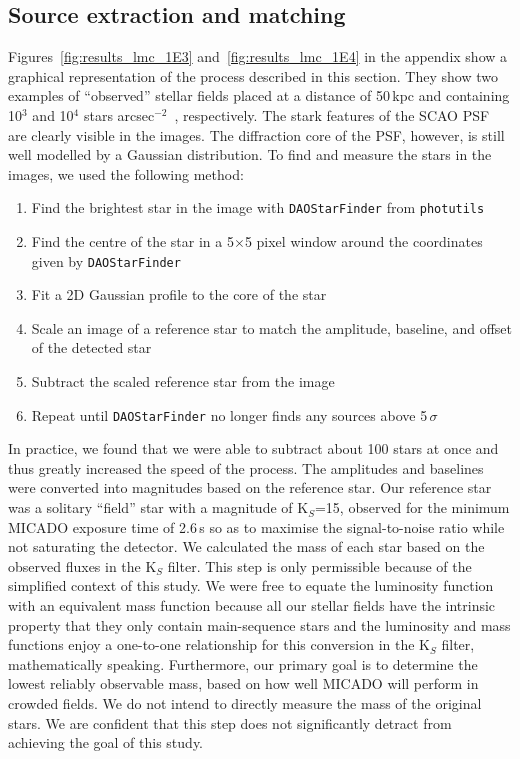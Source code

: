 \documentclass[referee]{aa}
\newcommand{\sig}{$\sigma$~}
\newcommand{\spa}{stars arcsec$^{-2}$~}
\begin{document}
\subsection{Source extraction and matching}
\label{subsec:source_extraction}

Figures~\ref{fig:results_lmc_1E3} and~\ref{fig:results_lmc_1E4} in the appendix show a graphical representation of the process described in this section.
They show two examples of ``observed'' stellar fields placed at a distance of 50\,kpc and containing 10$^3$ and 10$^4$ \spa , respectively.
The stark features of the SCAO PSF are clearly visible in the images.
The diffraction core of the PSF, however, is still well modelled by a Gaussian distribution.
To find and measure the stars in the images, we used the following method:

\begin{enumerate}
    \item Find the brightest star in the image with \verb+DAOStarFinder+ from \verb+photutils+~\citep{photutils}
    \item Find the centre of the star in a 5$\times$5 pixel window around the coordinates given by \verb+DAOStarFinder+
    \item Fit a 2D Gaussian profile to the core of the star
    \item Scale an image of a reference star to match the amplitude, baseline, and offset of the detected star
    \item Subtract the scaled reference star from the image
    \item Repeat until \verb+DAOStarFinder+ no longer finds any sources above 5\,\sig
\end{enumerate}

In practice, we found that we were able to subtract about 100 stars at once and thus greatly increased the speed of the process.
The amplitudes and baselines were converted into magnitudes based on the reference star.
Our reference star was a solitary ``field'' star with a magnitude of K$_S$=15, observed for the minimum {MICADO} exposure time of 2.6\,s so as to maximise the signal-to-noise ratio while not saturating the detector.
We calculated the mass of each star based on the observed fluxes in the K$_S$ filter.
This step is only permissible because of the simplified context of this study.
We were free to equate the luminosity function with an equivalent mass function because all our stellar fields have the intrinsic property that they only contain main-sequence stars and the luminosity and mass functions enjoy a one-to-one relationship for this conversion in the K$_S$ filter, mathematically speaking.
Furthermore, our primary goal is to determine the lowest reliably observable mass, based on how well MICADO will perform in crowded fields. We do not intend to directly measure the mass of the original stars.
We are confident that this step does not significantly detract from achieving the goal of this study.
\end{document}
